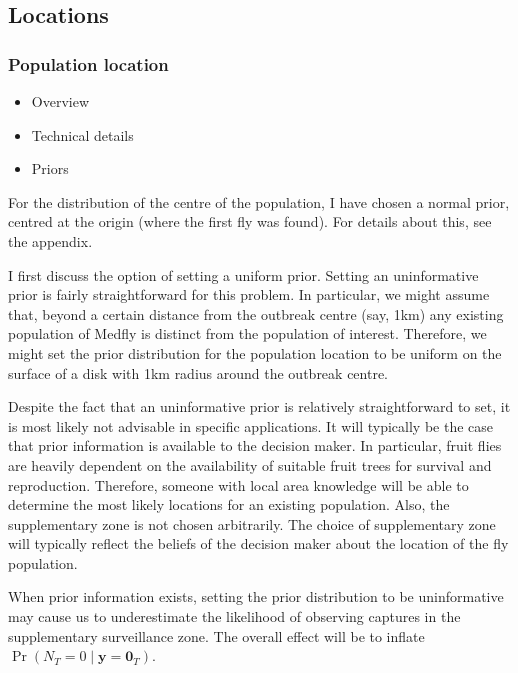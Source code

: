 \documentclass[
]{book}
\providecommand{\tightlist}{%
  \setlength{\itemsep}{0pt}\setlength{\parskip}{0pt}}
\begin{document}
\hypertarget{locations}{%
\subsection{Locations}\label{locations}}

\hypertarget{population-location}{%
\subsubsection{Population location}\label{population-location}}

\begin{itemize}
\tightlist
\item
  Overview
\item
  Technical details
\item
  Priors
\end{itemize}

For the distribution of the centre of the population, I have chosen a normal prior, centred at the origin (where the first fly was found). For details about this, see the appendix.

I first discuss the option of setting a uniform prior. Setting an uninformative prior is fairly straightforward for this problem. In particular, we might assume that, beyond a certain distance from the outbreak centre (say, 1km) any existing population of Medfly is distinct from the population of interest. Therefore, we might set the prior distribution for the population location to be uniform on the surface of a disk with 1km radius around the outbreak centre.

Despite the fact that an uninformative prior is relatively straightforward to set, it is most likely not advisable in specific applications. It will typically be the case that prior information is available to the decision maker. In particular, fruit flies are heavily dependent on the availability of suitable fruit trees for survival and reproduction. Therefore, someone with local area knowledge will be able to determine the most likely locations for an existing population. Also, the supplementary zone is not chosen arbitrarily. The choice of supplementary zone will typically reflect the beliefs of the decision maker about the location of the fly population.

When prior information exists, setting the prior distribution to be uninformative may cause us to underestimate the likelihood of observing captures in the supplementary surveillance zone. The overall effect will be to inflate \(\Pr(N_T = 0 \mid \mathbf y = \mathbf 0_T)\).
\end{document}
